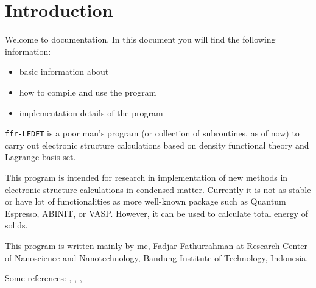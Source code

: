\section{Introduction}

Welcome to \ffrLFDFT documentation.
In this document you will find the following information:
\begin{itemize}
\item basic information about \ffrLFDFT
\item how to compile and use the program
\item implementation details of the program
\end{itemize}

{\tt ffr-LFDFT} is a poor man's program (or collection of subroutines, as of now)
to carry out electronic structure calculations based on density functional theory
and Lagrange basis set.

This program is intended for research in implementation of new methods in
electronic structure calculations in condensed matter.
Currently it is not as stable or have lot of functionalities
as more well-known package such as Quantum Espresso, ABINIT, or VASP.
However, it can be used to calculate total energy of solids.

This program is written mainly by me, Fadjar Fathurrahman at Research Center
of Nanoscience and Nanotechnology, Bandung Institute of Technology, Indonesia.


Some references: \cite{Liu2003}, \cite{HeeSeungLee2006}, \cite{Ma2010},
\cite{Baye2015}

